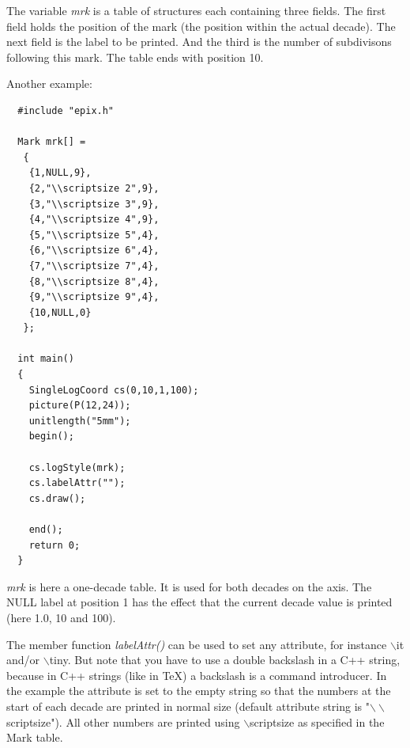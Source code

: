 \documentclass[12pt,a4paper]{article}
\begin{document}
  The variable \textit{mrk} is a table of structures each containing
  three fields. The first field holds the position of the mark (the
  position within the actual decade). The next field is the label to
  be printed. And the third is the number of subdivisons following
  this mark. The table ends with position 10.

  \newpage
  Another example:

  \begin{minipage}{8.0cm}
    \begin{lstlisting}
  #include "epix.h"

  Mark mrk[] =
   {
    {1,NULL,9},
    {2,"\\scriptsize 2",9},
    {3,"\\scriptsize 3",9},
    {4,"\\scriptsize 4",9},
    {5,"\\scriptsize 5",4},
    {6,"\\scriptsize 6",4},
    {7,"\\scriptsize 7",4},
    {8,"\\scriptsize 8",4},
    {9,"\\scriptsize 9",4},
    {10,NULL,0}
   };

  int main()
  {
    SingleLogCoord cs(0,10,1,100);
    picture(P(12,24));
    unitlength("5mm");
    begin();

    cs.logStyle(mrk);
    cs.labelAttr("");
    cs.draw();

    end();
    return 0;
  }
    \end{lstlisting}
  \end{minipage}
  \begin{minipage}{5.5cm}
    
  \end{minipage}

  \textit{mrk} is here a one-decade table. It is used for both decades
  on the axis. The NULL label at position 1 has the effect that the
  current decade value is printed (here 1.0, 10 and 100).

  The member function \textit{labelAttr()} can be used to set any
  attribute, for instance $\backslash$it and/or $\backslash$tiny. But
  note that you have to use a double backslash in a C++ string,
  because in C++ strings (like in \TeX) a backslash is a command
  introducer. In the example the attribute is set to the empty string
  so that the numbers at the start of each decade are printed in
  normal size (default attribute string is
  "$\backslash\backslash$scriptsize").  All other numbers are printed
  using $\backslash$scriptsize as specified in the Mark table.
\end{document}
